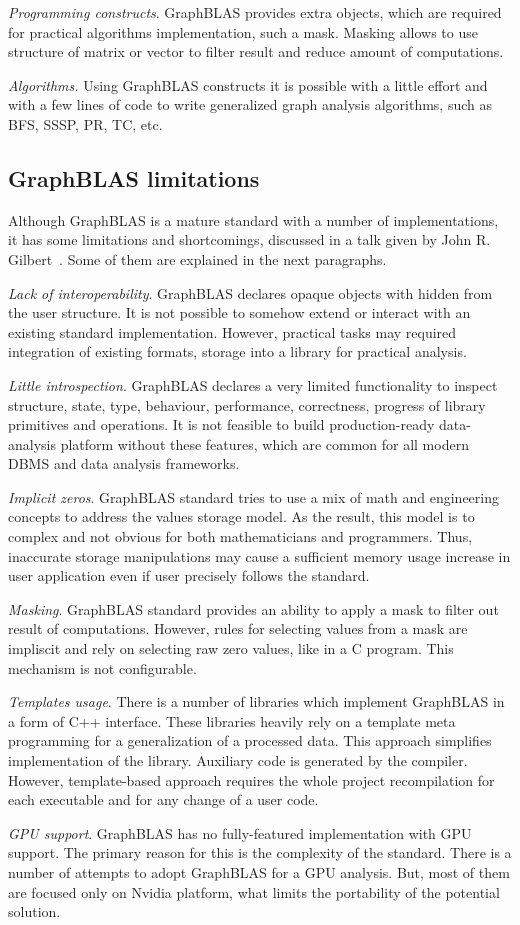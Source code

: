 \textit{Programming constructs}. GraphBLAS provides extra objects, which are required for practical algorithms implementation, such a mask. Masking allows to use structure of matrix or vector to filter result and reduce amount of computations.

\textit{Algorithms.} Using GraphBLAS constructs it is possible with a little effort and with a few lines of code to write generalized graph analysis algorithms, such as BFS, SSSP, PR, TC, etc.

\subsection{GraphBLAS limitations}

Although GraphBLAS is a mature standard with a number of implementations, it has some limitations and shortcomings, discussed in a talk given by John R. Gilbert~\cite{talk:graphblas_did_wrong}. Some of them are explained in the next paragraphs. 

\textit{Lack of interoperability}. GraphBLAS declares opaque objects with hidden from the user structure. It is not possible to somehow extend or interact with an existing standard implementation. However, practical tasks may required integration of existing formats, storage into a library for practical analysis. 

\textit{Little introspection}. GraphBLAS declares a very limited functionality to inspect structure, state, type, behaviour, performance, correctness, progress of library primitives and operations. It is not feasible to build production-ready data-analysis platform without these features, which are common for all modern DBMS and data analysis frameworks.

\textit{Implicit zeros}. GraphBLAS standard tries to use a mix of math and engineering concepts to address the values storage model. As the result, this model is to complex and not obvious for both mathematicians and programmers. Thus, inaccurate storage manipulations may cause a sufficient memory usage increase in user application even if user precisely follows the standard.

\textit{Masking}. GraphBLAS standard provides an ability to apply a mask to filter out result of computations. However, rules for selecting values from a mask are impliscit and rely on selecting raw zero values, like in a C program. This mechanism is not configurable.

\textit{Templates usage}. There is a number of libraries which implement GraphBLAS in a form of C++ interface. These libraries heavily rely on a template meta programming for a generalization of a processed data. This approach simplifies implementation of the library. Auxiliary code is generated by the compiler. However, template-based approach requires the whole project recompilation for each executable and for any change of a user code.

\textit{GPU support}. GraphBLAS has no fully-featured implementation with GPU support. The primary reason for this is the complexity of the standard. There is a number of attempts to adopt GraphBLAS for a GPU analysis. But, most of them are focused only on Nvidia platform, what limits the portability of the potential solution.